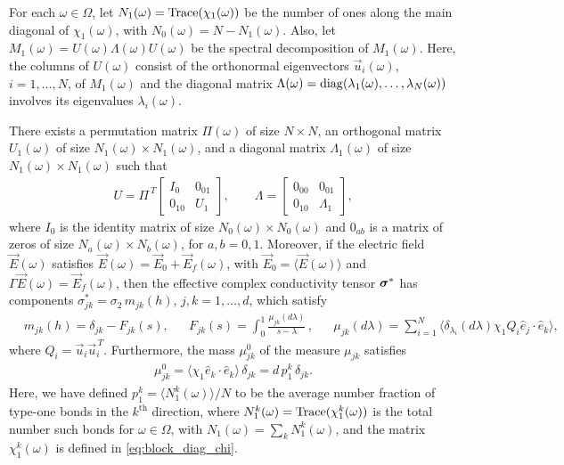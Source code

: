 \documentclass{cmslatex}
\newcommand\bsig{\mbox{\boldmath${\sigma}$}}
\begin{document}
\vspace{0.15in}
% 
\begin{theorem}\label{thm:Discrete_Spectral_Theorem_ACM}
  For each $\omega\in\Omega$,  let $N_1(\omega)={\rm Trace}(\chi_1(\omega))$ be the number of
  ones along the main diagonal of $\chi_1(\omega)$, with
  $N_0(\omega)=N-N_1(\omega)$. Also, let $M_1(\omega)=U(\omega)\Lambda(\omega)U(\omega)$ be the spectral
  decomposition of $M_1(\omega)$. Here, the columns of $U(\omega)$ consist of
  the orthonormal eigenvectors $\vec{u}_i(\omega)$, $i=1,\ldots,N$, of $M_1(\omega)$
  and the diagonal matrix $\Lambda(\omega)={\rm diag}(\lambda_1(\omega),\ldots,\lambda_N(\omega))$ involves
  its eigenvalues $\lambda_i(\omega)$.

  There exists a permutation matrix $\Pi(\omega)$ of size $N\times N$, an
  orthogonal matrix $U_1(\omega)$ of size $N_1(\omega)\times N_1(\omega)$, and a diagonal
  matrix $\Lambda_1(\omega)$ of size $N_1(\omega)\times N_1(\omega)$ such that       
  \begin{align}\label{eq:Spec_Decomp_chi_Gamma_chi}
U=\Pi^{\,T}\left[
  \begin{array}{ccc}
    I_0&0_{01}\\
    0_{10}&U_1   
    \end{array}
\right],
\qquad
\Lambda=\left[
  \begin{array}{ccc}
    0_{00}&0_{01}\\
    0_{10}&\Lambda_1   
    \end{array}
\right],
  \end{align}
  where $I_0$ is the identity matrix of size $N_0(\omega)\times N_0(\omega)$ and
  $0_{ab}$   is a matrix of zeros of size $N_a(\omega)\times N_b(\omega)$, for
  $a,b=0,1$. Moreover, if the electric field $\vec{E}(\omega)$
  satisfies
  $\vec{E}(\omega)=\vec{E}_0+\vec{E}_f(\omega)$, with $\vec{E}_0=\langle\vec{E}(\omega)\rangle$
  and $\Gamma\vec{E}(\omega)=\vec{E}_f(\omega)$, then the effective complex
  conductivity tensor $\bsig^*$ has components
  $\sigma_{jk}^*=\sigma_2\,m_{jk}(h)$, $j,k=1,\ldots,d$,  which satisfy       
%
\begin{align}\label{eq:Stieltjes_F_Discrete}
  &m_{jk}(h)=\delta_{jk}-F_{jk}(s), 
  &&F_{jk}(s)=\int_0^1\frac{\mu_{jk}(d\lambda)}{s-\lambda}\,, 
  &&\mu_{jk}(d\lambda)=\sum_{i=1}^N\langle \delta_{\lambda_i}(d\lambda)\chi_1Q_i\hat{e}_j\cdot\hat{e}_k\rangle,  
\end{align}
%
where $Q_i=\vec{u}_i\vec{u}_i^{\,T}$. Furthermore, the mass $\mu_{jk}^0$ of the
measure $\mu_{jk}$ satisfies 
%
\begin{align}\label{eq:Measure_Mass_theorem}
  \mu_{jk}^0=\langle\chi_1\hat{e}_k\cdot\hat{e}_k\rangle\,\delta_{jk}
       =d\,p_1^k\,\delta_{jk}.
\end{align}
%
Here, we have defined $p_1^k=\langle N_1^k(\omega)\rangle/N$ to be the average number
fraction of type-one bonds in the $k^{\text{th}}$ direction, where
$N_1^k(\omega)={\rm Trace}(\chi_1^k(\omega))$ is the total number such bonds for
$\omega\in\Omega$, with $N_1(\omega)=\sum_kN_1^k(\omega)$, and the matrix $\chi_1^k(\omega)$ is defined
in \eqref{eq:block_diag_chi}.
% 
\end{theorem}
\end{document}
